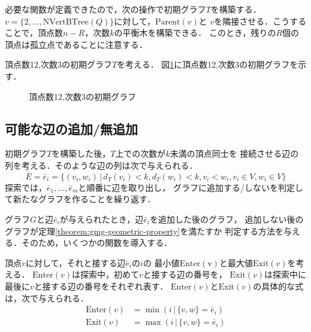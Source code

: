 必要な関数が定義できたので，次の操作で初期グラフ$T$を構築する．
$v=\{2,\ldots,\mathrm{NVertBTree}(Q)\}$に対して，$\mathrm{Parent}(v)$と
$v$を隣接させる．こうすることで，頂点数$n-R$，次数$k$の平衡木を構築できる．
このとき，残りの$R$個の頂点は孤立点であることに注意する．

\begin{example}
  頂点数12,次数3の初期グラフ$T$を考える．
  図\ref{fig:initial-tree-example}に頂点数12,次数3の初期グラフを示す．
  \begin{figure}
    \centering
    \def\svgwidth{.5\columnwidth}
    
    \caption{頂点数12,次数3の初期グラフ}
    \label{fig:initial-tree-example}
  \end{figure}
\end{example}

\subsection{可能な辺の追加/無追加}
\label{subsect:feasible-edge-(no)-addition}
初期グラフ$T$を構築した後，$T$上での次数が$k$未満の頂点同士を
接続させる辺の列を考える．そのような辺の列は次で与えられる．
\[ \bar{E} = \bar{e}_i = \{(v_i,w_i)\,|
\,d_T(v_i)<k,d_T(w_i)<k,v_i<w_i,v_i\in V,w_i\in V\} \]
探索では，$\bar{e}_1,\ldots,\bar{e}_m$と順番に辺を取り出し，
グラフに追加する/しないを判定して新たなグラフを作ることを繰り返す．

グラフ$G$と辺$\bar{e}_i$が与えられたとき，辺$\bar{e}_i$を追加した後のグラフ，
追加しない後のグラフが定理\ref{theorem:gmg-geometric-property}を満たすか
判定する方法を与える．そのため，いくつかの関数を導入する．
\begin{definition}
  頂点$v$に対して，それと接する辺$\bar{e}_i$の$i$の
  最小値$\mathrm{Enter(v)}$と最大値$\mathrm{Exit}(v)$を考える．
  $\mathrm{Enter}(v)$は探索中，初めて$v$と接する辺の番号を，
  $\mathrm{Exit}(v)$は探索中に最後に$v$と接する辺の番号をそれぞれ表す．
  $\mathrm{Enter}(v)$と$\mathrm{Exit}(v)$の具体的な式は，次で与えられる．
  \begin{align*}
    \mathrm{Enter}(v) &= \min(i\,|\,\{v,w\}=\bar{e}_i) \\
    \mathrm{Exit}(v) &= \max(i\,|\,\{v,w\}=\bar{e}_i)
  \end{align*}
\end{definition}

